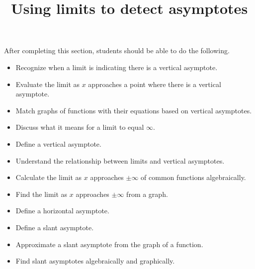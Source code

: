 \documentclass{ximera}
\title{Using limits to detect asymptotes}
\begin{document}
\begin{abstract}
\end{abstract}

\maketitle

\begin{sectionOutcomes}

After completing this section, students should be able to do the following.

\begin{itemize}
	\item Recognize when a limit is indicating there is a vertical asymptote.
	\item Evaluate the limit as $x$ approaches a point where there is a vertical asymptote.
	\item Match graphs of functions with their equations based on vertical asymptotes.
	\item Discuss what it means for a limit to equal $\infty$.
	\item Define a vertical asymptote.
	\item Understand the relationship between limits and vertical asymptotes.
	\item Calculate the limit as $x$ approaches $\pm \infty$ of common functions algebraically.
	\item Find the limit as $x$ approaches $\pm \infty$ from a graph.
	\item Define a horizontal asymptote.
	\item Define a slant asymptote.
        \item Approximate a slant asymptote from the graph of a
            function.
	\item Find slant asymptotes algebraically and graphically.
\end{itemize}
\end{sectionOutcomes}
\end{document}
